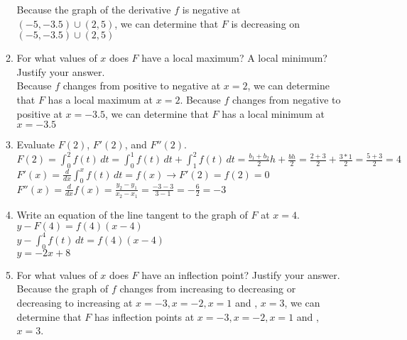 \documentclass[10pt, letterpaper]{report}
\begin{document}
\begin{enumerate}
\begin{enumerate}
      Because the graph of the derivative $f$ is negative at $(-5,-3.5)\cup(2,5)$, we can determine that $F$ is decreasing on $(-5,-3.5)\cup(2,5)$ \\

    \item{For what values of $x$ does $F$ have a local maximum? A local minimum? Justify your answer. } \\

      Because $f$ changes from positive to negative at $x=2$, we can determine that $F$ has a local maximum at $x=2$. Because $f$ changes from negative to positive at $x=-3.5$, we can determine that $F$ has a local minimum at $x=-3.5$ \\

    \item{Evaluate $F(2)$, $F'(2)$, and $F''(2)$.} \\

      $F(2)=\int_{0}^{2}{f(t)}\,dt=\int_{0}^{1}{f(t)}\,dt+\int_{1}^{2}{f(t)}\,dt=
      \frac{b_{1}+b_{2}}{2}h + \frac{bh}{2} = \frac{2+3}{2} + \frac{3*1}{2} = \frac{5+3}{2} = 4$ \\

      $F'(x)=\frac{d}{dx}\int_{0}^{x}{f(t)}\,dt = f(x)\rightarrow F'(2) = f(2) = 0$ \\

      $F''(x) = \frac{d}{dx}f(x) = \frac{y_{2}-y_{1}}{x_{2}-x_{1}}=\frac{-3-3}{3-1}=-\frac{6}{2}=-3$ \\

    \item{Write an equation of the line tangent to the graph of $F$ at $x=4$.} \\

      $y - F(4) = f(4)(x - 4)$ \\

      $y - \int_{0}^{4}{f(t)}\,dt = f(4)(x - 4)$ \\

      $y = -2x + 8$ \\

    \item{For what values of $x$ does $F$ have an inflection point? Justify your answer.} \\

      Because the graph of $f$ changes from increasing to decreasing or decreasing to increasing at $x=-3, x=-2, x=1$ and , $x=3$, we can determine that $F$ has inflection points at $x=-3, x=-2, x=1$ and , $x=3$.\\


\end{enumerate}
\end{enumerate}
\end{document}
